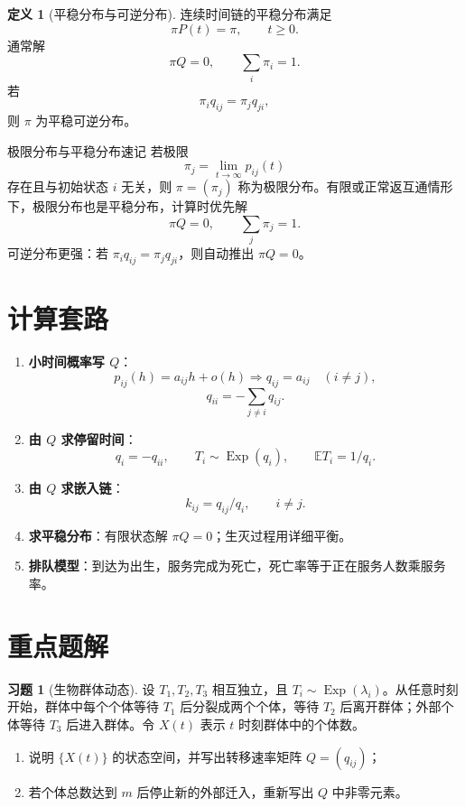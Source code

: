 \documentclass[12pt,a4paper,openany]{ctexrep}
\theoremstyle{definition}
\newtheorem{definition}{定义}[section]
\newtheorem{exercise}{习题}[section]
\newcommand{\E}{\mathbb{E}}
\newcommand{\Exp}{\operatorname{Exp}}
\begin{document}
\begin{definition}[平稳分布与可逆分布]
连续时间链的平稳分布满足
\[
\pi P(t)=\pi,\qquad t\ge0.
\]
通常解
\[
\pi Q=0,\qquad \sum_i\pi_i=1.
\]
若
\[
\pi_iq_{ij}=\pi_jq_{ji},
\]
则 $\pi$ 为平稳可逆分布。
\end{definition}

\begin{reviewbox}{极限分布与平稳分布速记}
若极限
\[
\pi_j=\lim_{t\to\infty}p_{ij}(t)
\]
存在且与初始状态 $i$ 无关，则 $\pi=(\pi_j)$ 称为极限分布。有限或正常返互通情形下，极限分布也是平稳分布，计算时优先解
\[
\pi Q=0,\qquad \sum_j\pi_j=1.
\]
可逆分布更强：若 $\pi_iq_{ij}=\pi_jq_{ji}$，则自动推出 $\pi Q=0$。
\end{reviewbox}

\section{计算套路}

\begin{enumerate}[label=\textbf{套路 \arabic*:}]
	\item \textbf{小时间概率写 $Q$}：
	\[
	p_{ij}(h)=a_{ij}h+o(h)\Rightarrow q_{ij}=a_{ij}\quad(i\ne j),
	\]
	\[
	q_{ii}=-\sum_{j\ne i}q_{ij}.
	\]
	\item \textbf{由 $Q$ 求停留时间}：
	\[
	q_i=-q_{ii},\qquad T_i\sim\Exp(q_i),\qquad \E T_i=1/q_i.
	\]
	\item \textbf{由 $Q$ 求嵌入链}：
	\[
	k_{ij}=q_{ij}/q_i,\qquad i\ne j.
	\]
	\item \textbf{求平稳分布}：有限状态解 $\pi Q=0$；生灭过程用详细平衡。
	\item \textbf{排队模型}：到达为出生，服务完成为死亡，死亡率等于正在服务人数乘服务率。
\end{enumerate}

\section{重点题解}

\begin{exercise}[生物群体动态]
设 $T_1,T_2,T_3$ 相互独立，且 $T_i\sim\Exp(\lambda_i)$。从任意时刻开始，群体中每个个体等待 $T_1$ 后分裂成两个个体，等待 $T_2$ 后离开群体；外部个体等待 $T_3$ 后进入群体。令 $X(t)$ 表示 $t$ 时刻群体中的个体数。
\begin{enumerate}[label=(\alph*)]
	\item 说明 $\{X(t)\}$ 的状态空间，并写出转移速率矩阵 $Q=(q_{ij})$；
	\item 若个体总数达到 $m$ 后停止新的外部迁入，重新写出 $Q$ 中非零元素。
\end{enumerate}
\end{exercise}
\end{document}
